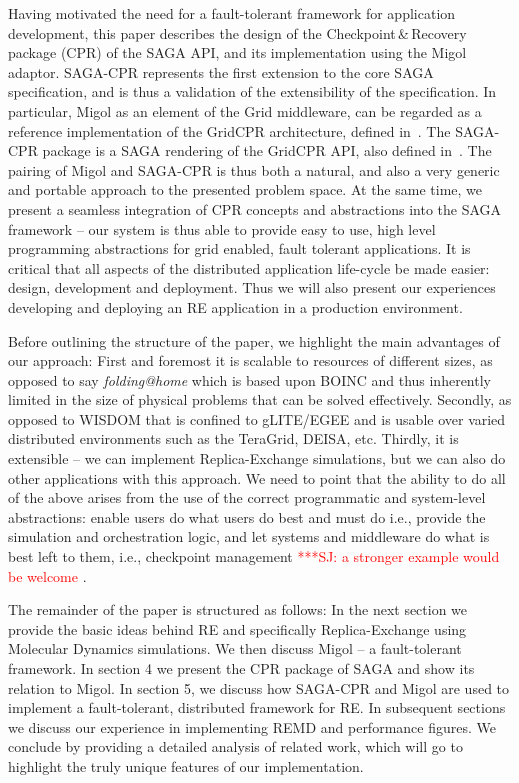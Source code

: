 \documentclass[times, 10pt, twocolumn]{article}
\newcommand{\jhanote}[1]{ {\textcolor{red} { ***SJ: #1 }}}
\newcommand{\jhanote}[1]{}
\begin{document}
Having motivated the need for a fault-tolerant framework for
application development, this paper describes the design of the
Checkpoint\,\&\,Recovery package (CPR) of the SAGA API, and its
implementation using the Migol adaptor. SAGA-CPR represents the first
extension to the core SAGA specification, and is thus a validation of
the extensibility of the specification.  In particular, Migol as an
element of the Grid middleware, can be regarded as a reference
implementation of the GridCPR architecture, defined
in~\cite{ogf_cpr_arch}.  The SAGA-CPR package is a SAGA rendering of
the GridCPR API, also defined in~\cite{ogf_cpr_arch}.  The pairing of
Migol and SAGA-CPR is thus both a natural, and also a very generic and
portable approach to the presented problem space.  At the same time,
we present a seamless integration of CPR concepts and abstractions
into the SAGA framework -- our system is thus able to provide easy to
use, high level programming abstractions for grid enabled, fault
tolerant applications.  It is critical that all aspects of the
distributed application life-cycle be made easier: design, development
and deployment. Thus we will also present our experiences developing
and deploying an RE application in a production environment.

Before outlining the structure of the paper, we highlight the main
advantages of our approach: First and foremost it is scalable to
resources of different sizes, as opposed to say {\it folding@home}
which is based upon BOINC and thus inherently limited in the size of
physical problems that can be solved effectively. Secondly, as opposed
to WISDOM that is confined to gLITE/EGEE and is usable over varied
distributed environments such as the TeraGrid, DEISA, etc. Thirdly, it
is extensible -- we can implement Replica-Exchange simulations, but we
can also do other applications with this approach. We need to point
that the ability to do all of the above arises from the use of the
correct programmatic and system-level abstractions: enable users do
what users do best and must do i.e., provide the simulation and
orchestration logic, and let systems and middleware do what is best
left to them, i.e., checkpoint management \jhanote{a stronger example
  would be welcome}.

The remainder of the paper is structured as follows: In the next
section we provide the basic ideas behind RE and specifically
Replica-Exchange using Molecular Dynamics simulations.  We then
discuss Migol -- a fault-tolerant framework. In section 4 we present
the CPR package of SAGA and show its relation to Migol. In section 5,
we discuss how SAGA-CPR and Migol are used to implement a
fault-tolerant, distributed framework for RE. In subsequent sections
we discuss our experience in implementing REMD and performance
figures. We conclude by providing a detailed analysis of related work,
which will go to highlight the truly unique features of our
implementation.
\end{document}
